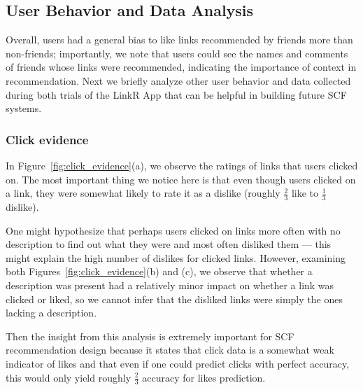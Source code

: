 
\subsection{User Behavior and Data Analysis}

\label{sec:behavior}

Overall, users had a general bias to like links recommended by friends
more than non-friends; importantly, we note that users could see the
names and comments of friends whose links were recommended, indicating
the importance of context in recommendation.  Next we briefly analyze
other user behavior and data collected during both trials of the
LinkR App that can be helpful in building future SCF systems.

\subsubsection{Click evidence}

In Figure~\ref{fig:click_evidence}(a), we observe the ratings of links
that users clicked on.  The most important thing we notice 
here is that even though users
clicked on a link, they were somewhat likely to rate it as a dislike
(roughly $\frac{2}{3}$ like to $\frac{1}{3}$ dislike).

One might hypothesize that perhaps users clicked on links more often
with no description to find out what they were and most often disliked
them --- this might explain the high number of dislikes for clicked
links.  However, examining both Figures~\ref{fig:click_evidence}(b)
and (c), we observe that whether a description was present had a
relatively minor impact on whether a link was clicked or liked, so we
cannot infer that the disliked links were simply the ones lacking a
description.

Then the insight from this analysis is extremely important 
for SCF recommendation design because it states that click data is a somewhat 
weak indicator of likes and that even if one could predict 
clicks with perfect accuracy, this would only yield 
roughly $\frac{2}{3}$ accuracy for likes prediction.

